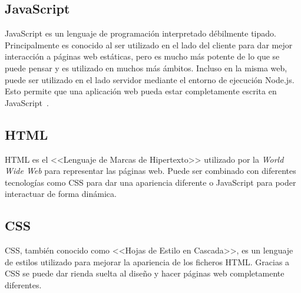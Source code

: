 \subsection{JavaScript}
JavaScript es un lenguaje de programación interpretado débilmente tipado. Principalmente es conocido al ser utilizado en el lado del cliente para dar mejor interacción a páginas web estáticas, pero es mucho más potente de lo que se puede pensar y es utilizado en muchos más ámbitos. Incluso en la misma web, puede ser utilizado en el lado servidor mediante el entorno de ejecución Node.js. Esto permite que una aplicación web pueda estar completamente escrita en JavaScript~\cite{javascript}.

\subsection{HTML}
HTML es el <<Lenguaje de Marcas de Hipertexto>> utilizado por la \textit{World Wide Web} para representar las páginas web. Puede ser combinado con diferentes tecnologías como CSS para dar una apariencia diferente o JavaScript para poder interactuar de forma dinámica.

\subsection{CSS}
CSS, también conocido como <<Hojas de Estilo en Cascada>>, es un lenguaje de estilos utilizado para mejorar la apariencia de los ficheros HTML. Gracias a CSS se puede dar rienda suelta al diseño y hacer páginas web completamente diferentes.

